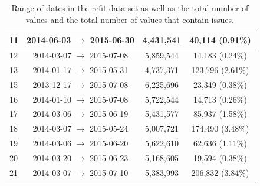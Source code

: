 \begin{table}[H]
\begin{adjustwidth}{-3.0cm}{-3.0cm}
\begin{tabular}{cccc}
                        11                        & 2014-06-03 $\rightarrow$ 2015-06-30 & 4,431,541                       & 40,114 (0.91\%)                    \\ \midrule
                        12                        & 2014-03-07 $\rightarrow$ 2015-07-08 & 5,859,544                       & 14,183 (0.24\%)                    \\ \midrule
                        13                        & 2014-01-17 $\rightarrow$ 2015-05-31 & 4,737,371                       & 123,796 (2.61\%)                   \\ \midrule
                        15                        & 2013-12-17 $\rightarrow$ 2015-07-08 & 6,225,696                       & 23,349 (0.38\%)                    \\ \midrule
                        16                        & 2014-01-10 $\rightarrow$ 2015-07-08 & 5,722,544                       & 14,713 (0.26\%)                    \\ \midrule
                        17                        & 2014-03-06 $\rightarrow$ 2015-06-19 & 5,431,577                       & 85,937 (1.58\%)                    \\ \midrule
                        18                        & 2014-03-07 $\rightarrow$ 2015-05-24 & 5,007,721                       & 174,490 (3.48\%)                   \\ \midrule
                        19                        & 2014-03-06 $\rightarrow$ 2015-06-20 & 5,622,610                       & 62,636 (1.11\%)                    \\ \midrule
                        20                        & 2014-03-20 $\rightarrow$ 2015-06-23 & 5,168,605                       & 19,594 (0.38\%)                    \\ \midrule
                        21                        & 2014-03-07 $\rightarrow$ 2015-07-10 & 5,383,993                       & 206,832 (3.84\%)                   \\ \bottomrule
                \end{tabular}
                \caption{Range of dates in the \gls{refit} data set as well as the total number of values and the total number of values that contain issues.}
                \label{tab:REFIT-values-recorded}
        \end{adjustwidth}
\end{table}

